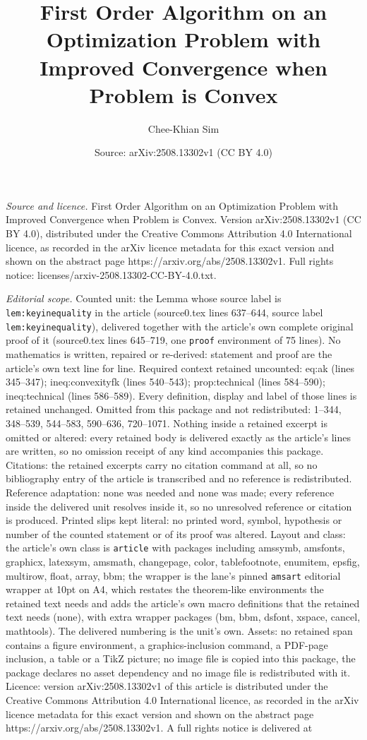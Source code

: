 \documentclass[10pt,a4paper]{amsart}
\title[First Order Algorithm on an Optimization Problem with Improv]{First Order Algorithm on an Optimization Problem with Improved Convergence when Problem is Convex}
\author{Chee-Khian Sim}
\date{Source: arXiv:2508.13302v1 (CC BY 4.0)}
\begin{document}
\maketitle

\noindent\emph{Source and licence.} First Order Algorithm on an Optimization Problem with Improved Convergence when Problem is Convex. Version arXiv:2508.13302v1 (CC BY 4.0), distributed under the Creative Commons Attribution 4.0 International licence, as recorded in the arXiv licence metadata for this exact version and shown on the abstract page https://arxiv.org/abs/2508.13302v1. Full rights notice: licenses/arxiv-2508.13302-CC-BY-4.0.txt.\par\smallskip

\noindent\textit{Editorial scope.} Counted unit: the Lemma whose source label is \texttt{lem:keyinequality} in the article (source0.tex lines 637--644, source label \texttt{lem:keyinequality}), delivered together with the article's own complete original proof of it (source0.tex lines 645--719, one \texttt{proof} environment of 75 lines). No mathematics is written, repaired or re-derived: statement and proof are the article's own text line for line. Required context retained uncounted: eq:ak (lines 345--347); ineq:convexityfk (lines 540--543); prop:technical (lines 584--590); ineq:technical (lines 586--589). Every definition, display and label of those lines is retained unchanged. Omitted from this package and not redistributed: 1--344, 348--539, 544--583, 590--636, 720--1071. Nothing inside a retained excerpt is omitted or altered: every retained body is delivered exactly as the article's lines are written, so no omission receipt of any kind accompanies this package. Citations: the retained excerpts carry no citation command at all, so no bibliography entry of the article is transcribed and no reference is redistributed. Reference adaptation: none was needed and none was made; every reference inside the delivered unit resolves inside it, so no unresolved reference or citation is produced. Printed slips kept literal: no printed word, symbol, hypothesis or number of the counted statement or of its proof was altered. Layout and class: the article's own class is \texttt{article} with packages including amssymb, amsfonts, graphicx, latexsym, amsmath, changepage, color, tablefootnote, enumitem, epsfig, multirow, float, array, bbm; the wrapper is the lane's pinned \texttt{amsart} editorial wrapper at 10pt on A4, which restates the theorem-like environments the retained text needs and adds the article's own macro definitions that the retained text needs (none), with extra wrapper packages (bm, bbm, dsfont, xspace, cancel, mathtools). The delivered numbering is the unit's own. Assets: no retained span contains a figure environment, a graphics-inclusion command, a PDF-page inclusion, a table or a TikZ picture; no image file is copied into this package, the package declares no asset dependency and no image file is redistributed with it. Licence: version arXiv:2508.13302v1 of this article is distributed under the Creative Commons Attribution 4.0 International licence, as recorded in the arXiv licence metadata for this exact version and shown on the abstract page https://arxiv.org/abs/2508.13302v1. A full rights notice is delivered at 
\end{document}

